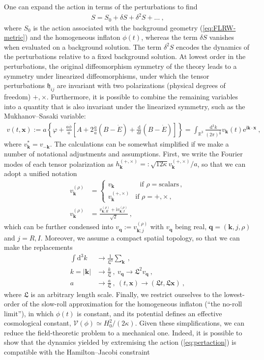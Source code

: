 \documentclass[12pt]{iopart}
\def\eq#1{\begin{equation}\begin{aligned}#1\end{aligned}\end{equation}}
\def\eref#1{(\ref{eq:#1})}
\def\D{\mathrm{d}}
\def\e{\mathrm{e}}
\def\I{\mathrm{i}}
\def\Del#1#2{\frac{\D#1}{\D#2}}
\def\x{\mathbf{x}}
\def\k{\mathbf{k}}
\def\q{\mathbf{q}}
\begin{document}
One can expand the action in terms of the perturbations to find
\eq{\label{eq:pertaction}
S = S_0+\delta S+\delta^2S+\ldots \ , 
}
where $S_0$ is the action associated with the background geometry \eref{FLRW-metric} and the homogeneous inflaton $\phi(t)$, whereas the term $\delta S$ vanishes when evaluated on a background solution. The term $\delta^2S$ encodes the dynamics of the perturbations relative to a fixed background solution. At lowest order in the perturbations, the original diffeomorphism symmetry of the theory leads to a symmetry under linearized diffeomorphisms, under which the tensor perturbations $\mathfrak{h}_{ij}$ are invariant with two polarizations (physical degrees of freedom) $+,\times$. Furthermore, it is possible to combine the remaining variables into a quantity that is also invariant under the linearized symmetry, such as the Mukhanov--Sasaki variable:
\eq{
v(t,\x):=a\left\{\varphi+\frac{a\dot{\phi}}{\dot{a}}\left[A+2\frac{\dot{a}}{a}(B-\dot{E})+\Del{}{t}(B-\dot{E})\right]\right\} = \int_{\mathbb{R}^3}\frac{\D^3k}{(2\pi)^{\frac32}}v_{\mathbf{k}}(t)\e^{\I\mathbf{k}\cdot\x} \ ,
}
where $v_{\k}^* = v_{-\k}$. The calculations can be somewhat simplified if we make a number of notational adjustments and assumptions. First, we write the Fourier modes of each tensor polarization as $h_{\k}^{(+,\times)} =: \sqrt{12\kappa}v_{\k}^{(+,\times)}/a$, so that we can adopt a unified notation
\eq{\label{eq:vq}
v_{\k}^{(\rho)} &= \left\{\begin{matrix}
\!\!\!\!\!v_{\k} & \ \ \ \text{if }\rho = \text{scalars}\,,\\
v_{\k}^{(+,\times)} & \text{if }\rho = +,\times \,,
\end{matrix}\right. \\
v_{\k}^{(\rho)} &= \frac{v_{\k;R}^{(\rho)}+\I v_{\k;I}^{(\rho)}}{\sqrt{2}} \ ,
}
which can be further condensed into $v_{\q} := v_{\k;j}^{(\rho)}$ with $v_{\q}$ being real, $\q = (\k,j,\rho)$ and $j=R,I$. Moreover, we assume a compact spatial topology, so that we can make the replacements \citep{KTV1,KTV2,KTV3,Brizuela:2015tzl,Brizuela:2016gnz}
\eq{\label{eq:replacements}
\int\D^3k&\to\frac{1}{\mathfrak{L}^3}\sum_{\k}\ ,\\ 
k = |\k| &\to \frac{k}{\mathfrak{L}} \ , \
v_{\q}\to \mathfrak{L}^2 v_{\q} \ , \\
a &\to \frac{a}{\mathfrak{L}} \ , \ (t,\x) \to (\mathfrak{L}t,\mathfrak{L}\x) \ ,
}
where $\mathfrak{L}$ is an arbitrary length scale. Finally, we restrict ourselves to the lowest-order of the slow-roll approximation for the homogeneous inflaton (``the no-roll limit''), in which $\phi(t)$ is constant, and its potential defines an effective cosmological constant, $\mathcal{V}(\phi) \simeq H_0^2/(2\kappa)$. Given these simplifications, we can reduce the field-theoretic problem to a mechanical one. Indeed, it is possible to show that the dynamics yielded by extremising the action \eref{pertaction} is compatible with the Hamilton--Jacobi constraint
\end{document}
